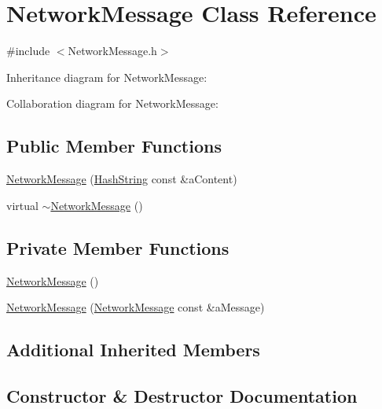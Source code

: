 \hypertarget{classNetworkMessage}{}\section{Network\+Message Class Reference}
\label{classNetworkMessage}


{\ttfamily \#include $<$Network\+Message.\+h$>$}



Inheritance diagram for Network\+Message\+:


Collaboration diagram for Network\+Message\+:
\subsection*{Public Member Functions}
\begin{DoxyCompactItemize}
\item 
\hyperlink{classNetworkMessage_a744e39da57a6e48f20fa0d0323fe95fe}{Network\+Message} (\hyperlink{classHashString}{Hash\+String} const \&a\+Content)
\item 
virtual \hyperlink{classNetworkMessage_a80a52f3e61a40e07c035a8f9b11b7c80}{$\sim$\+Network\+Message} ()
\end{DoxyCompactItemize}
\subsection*{Private Member Functions}
\begin{DoxyCompactItemize}
\item 
\hyperlink{classNetworkMessage_ac18472a059c0f7c15a8e9840ab635d73}{Network\+Message} ()
\item 
\hyperlink{classNetworkMessage_a1b72b6382ae56b96145633bfeadb191b}{Network\+Message} (\hyperlink{classNetworkMessage}{Network\+Message} const \&a\+Message)
\end{DoxyCompactItemize}
\subsection*{Additional Inherited Members}


\subsection{Constructor \& Destructor Documentation}
